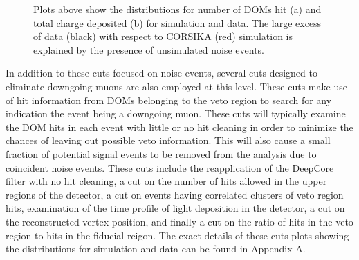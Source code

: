 \documentclass{gatech-thesis}
\begin{document}
\begin{figure}\label{fig:MicroHitAndCharge}
\centering
{}
\caption{Plots above show the distributions for number of DOMs hit (a) and total charge deposited (b) for simulation and data. The large excess of data (black) with respect to CORSIKA (red) simulation is explained by the presence of unsimulated noise events.} 
\end{figure}

In addition to these cuts focused on noise events, several cuts designed to eliminate downgoing muons are also employed at this level. These cuts make use of hit information from DOMs belonging to the veto region to search for any indication the event being a downgoing muon. These cuts will typically examine the DOM hits in each event with little or no hit cleaning in order to minimize the chances of leaving out possible veto information. This will also cause a small fraction of potential signal events to be removed from the analysis due to coincident noise events. These cuts include the reapplication of the DeepCore filter with no hit cleaning, a cut on the number of hits allowed in the upper regions of the detector, a cut on events having correlated clusters of veto region hits, examination of the time profile of light deposition in the detector, a cut on the reconstructed vertex position, and finally a cut on the ratio of hits in the veto region to hits in the fiducial reigon. The exact details of these cuts plots showing the distributions for simulation and data can be found in Appendix A.
\end{document}
